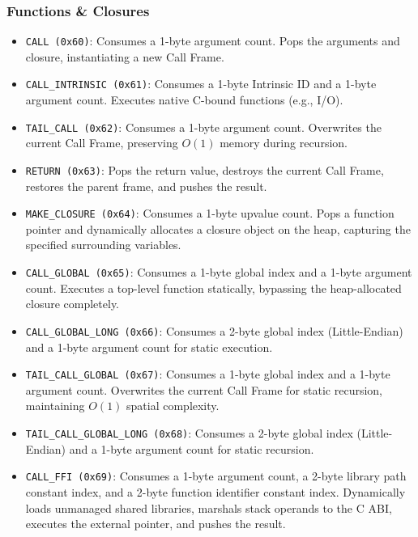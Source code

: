 \documentclass[11pt, a4paper]{article}
\begin{document}
\subsubsection*{Functions \& Closures}
\begin{itemize}
    \item \texttt{CALL (0x60)}: Consumes a 1-byte argument count. Pops the arguments and closure, instantiating a new Call Frame.
    \item \texttt{CALL\_INTRINSIC (0x61)}: Consumes a 1-byte Intrinsic ID and a 1-byte argument count. Executes native C-bound functions (e.g., I/O).
    \item \texttt{TAIL\_CALL (0x62)}: Consumes a 1-byte argument count. Overwrites the current Call Frame, preserving $O(1)$ memory during recursion.
    \item \texttt{RETURN (0x63)}: Pops the return value, destroys the current Call Frame, restores the parent frame, and pushes the result.
    \item \texttt{MAKE\_CLOSURE (0x64)}: Consumes a 1-byte upvalue count. Pops a function pointer and dynamically allocates a closure object on the heap, capturing the specified surrounding variables.
    \item \texttt{CALL\_GLOBAL (0x65)}: Consumes a 1-byte global index and a 1-byte argument count. Executes a top-level function statically, bypassing the heap-allocated closure completely.
    \item \texttt{CALL\_GLOBAL\_LONG (0x66)}: Consumes a 2-byte global index (Little-Endian) and a 1-byte argument count for static execution.
    \item \texttt{TAIL\_CALL\_GLOBAL (0x67)}: Consumes a 1-byte global index and a 1-byte argument count. Overwrites the current Call Frame for static recursion, maintaining $O(1)$ spatial complexity.
    \item \texttt{TAIL\_CALL\_GLOBAL\_LONG (0x68)}: Consumes a 2-byte global index (Little-Endian) and a 1-byte argument count for static recursion.
    \item \texttt{CALL\_FFI (0x69)}: Consumes a 1-byte argument count, a 2-byte library path constant index, and a 2-byte function identifier constant index. Dynamically loads unmanaged shared libraries, marshals stack operands to the C ABI, executes the external pointer, and pushes the result.
\end{itemize}
\end{document}
